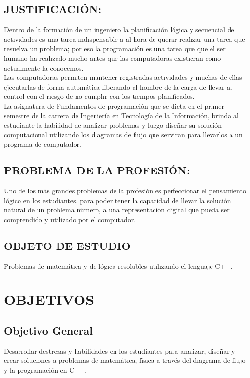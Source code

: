 \documentclass[a4pa<per,12pt,spanish]{article}
\begin{document}
\subsection{JUSTIFICACIÓN:}

Dentro de la formación de un ingeniero la planificación lógica y secuencial de actividades es una tarea indispensable a al hora de querar realizar una tarea que resuelva un problema; por eso la programación es una tarea que que el ser humano ha realizado mucho antes que las computadoras existieran como actualmente la conocemos.\\


Las computadoras permiten mantener registradas actividades y muchas de ellas ejecutarlas de forma automática liberando al hombre de la carga de llevar al control con el riesgo de no cumplir con los tiempos planificados.\\




La asignatura de Fundamentos de programación que se dicta en el primer semestre de la carrera de Ingeniería en Tecnología de la Información, brinda al estudiante la habilidad de analizar problemas y luego diseñar su solución computacional utilizando los diagramas de flujo que serviran para llevarlos a un programa de computador.




\subsection{PROBLEMA DE LA PROFESIÓN:}


Uno de los más grandes problemas de la profesión es perfeccionar el pensamiento lógico en los estudiantes, para poder tener la capacidad de llevar la solución natural  de un problema número,  a una representación digital que pueda ser comprendido y utilizado por el computador.


\subsection{OBJETO DE ESTUDIO}
Problemas de matemática y de lógica resolubles utilizando el lenguaje  C++.

\newpage

\section{OBJETIVOS}
\subsection{Objetivo General}
Desarrollar destrezas y habilidades en los estudiantes para analizar, diseñar y crear soluciones a problemas de matemática, física a través del diagrama de flujo y la programación  en C++.
\end{document}
